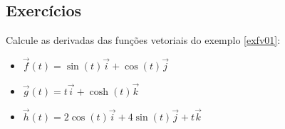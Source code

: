 




\subsection*{Exercícios}

\begin{exer}Calcule as derivadas das funções vetoriais do exemplo \ref{exfv01}:
\begin{itemize}
\item [a)] $\vec{f}(t)=\sin(t)\vec{i}+\cos(t)\vec{j}$
\item [b)] $\vec{g}(t)=t \vec{i}+\cosh(t)\vec{k}$
\item [c)] $\vec{h}(t)=2\cos(t)\vec{i}+4\sin(t)\vec{j}+t\vec{k}$
\end{itemize}
\end{exer}

